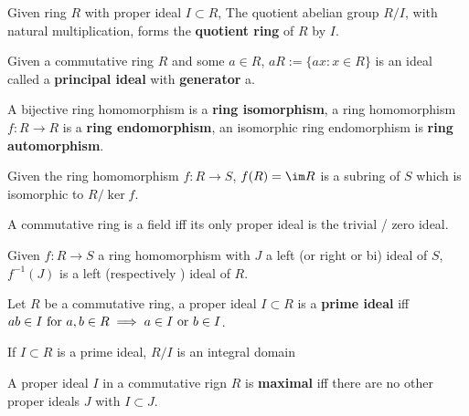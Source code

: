 \documentclass[../Year2.tex]{subfiles}
\begin{document}
\begin{definition}
    Given ring $R$ with proper ideal $I\subset R$, The quotient abelian group $R/I$, with natural multiplication, forms the \textbf{quotient ring} of $R$ by $I$.
\end{definition}

\begin{definition}
    Given a commutative ring $R$ and some $a\in R$, $aR:= \{ax:x\in R\}$ is an ideal called a \textbf{principal ideal} with \textbf{generator} a.
\end{definition}

\begin{definition}
    A bijective ring homomorphism is a \textbf{ring isomorphism}, a ring homomorphism $f:R\rightarrow R$ is a \textbf{ring endomorphism}, an isomorphic ring endomorphism is \textbf{ring automorphism}.
\end{definition}

\begin{proposition}
    Given the ring homomorphism $f:R\rightarrow S$, $f(R)=\im R$ is a subring of $S$ which is isomorphic to $R/\ker f$.
\end{proposition}

\begin{proposition}
    A commutative ring is a field iff its only proper ideal is the trivial / zero ideal.
\end{proposition}

\begin{proposition}
    Given $f:R\rightarrow S$ a ring homomorphism with $J$ a left (or right or bi) ideal of $S$, $f^{-1}(J)$ is a left (respectively ) ideal of $R$.
\end{proposition}

\begin{definition}
    Let $R$ be a commutative ring, a proper ideal $I\subset R$ is a \textbf{prime ideal} iff $ab\in I \ \text{\textcolor{black}{for }} a,b\in R \implies a\in I \ \text{\textcolor{black}{or }} b\in I$.
\end{definition}

\begin{theorem}
    If $I\subset R$ is a prime ideal, $R/I$ is an integral domain
\end{theorem}

\begin{definition}
    A proper ideal $I$ in a commutative rign $R$ is \textbf{maximal} iff there are no other proper ideals $J$ with $I\subset J$.
\end{definition}
\end{document}
